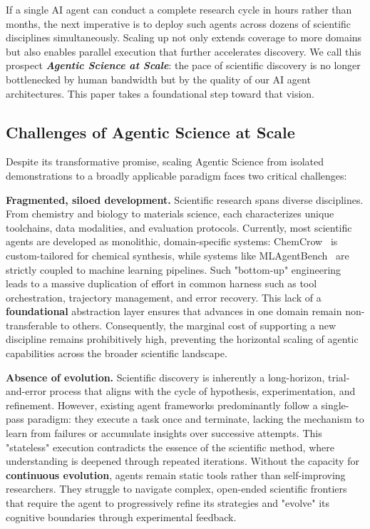 \documentclass[11pt, a4paper, logo, copyright, nonumbering]{cls/Sci}
\begin{document}
If a single AI agent can conduct a complete research cycle in hours rather than months, the next imperative is to deploy such agents across dozens of scientific disciplines simultaneously. Scaling up not only extends coverage to more domains but also enables parallel execution that further accelerates discovery. We call this prospect \emph{\textbf{Agentic Science at Scale}}: the pace of scientific discovery is no longer bottlenecked by human bandwidth but by the quality of our AI agent architectures. This paper takes a foundational step toward that vision.

\subsection{Challenges of Agentic Science at Scale}

Despite its transformative promise, scaling Agentic Science from isolated demonstrations to a broadly applicable paradigm faces two critical challenges:



\textbf{Fragmented, siloed development.} Scientific research spans diverse disciplines. From chemistry and biology to materials science, each characterizes unique toolchains, data modalities, and evaluation protocols. Currently, most scientific agents are developed as monolithic, domain-specific systems: ChemCrow~\citep{bran2024augmenting} is custom-tailored for chemical synthesis, while systems like MLAgentBench~\citep{huang2023mlagentbench} are strictly coupled to machine learning pipelines. Such "bottom-up" engineering leads to a massive duplication of effort in common harness such as tool orchestration, trajectory management, and error recovery. This lack of a \textbf{foundational} abstraction layer ensures that advances in one domain remain non-transferable to others. Consequently, the marginal cost of supporting a new discipline remains prohibitively high, preventing the horizontal scaling of agentic capabilities across the broader scientific landscape.

\textbf{Absence of evolution.} Scientific discovery is inherently a long-horizon, trial-and-error process that aligns with the cycle of hypothesis, experimentation, and refinement. However, existing agent frameworks predominantly follow a single-pass paradigm: they execute a task once and terminate, lacking the mechanism to learn from failures or accumulate insights over successive attempts. This "stateless" execution contradicts the essence of the scientific method, where understanding is deepened through repeated iterations. Without the capacity for \textbf{continuous evolution}, agents remain static tools rather than self-improving researchers. They struggle to navigate complex, open-ended scientific frontiers that require the agent to progressively refine its strategies and "evolve" its cognitive boundaries through experimental feedback.
\end{document}
